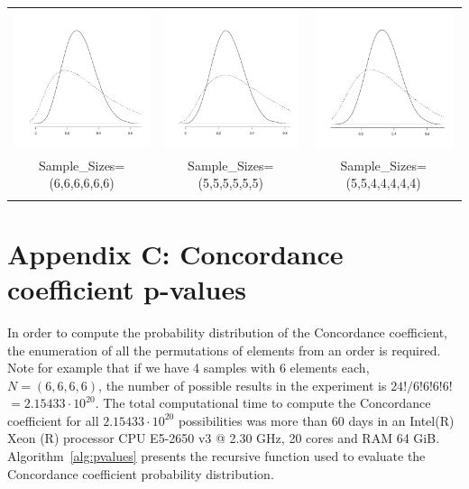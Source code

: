 \begin{appendix}
\begin{longtable}{ccc}
\includegraphics[width=4.05cm]{Sim_Kendall-Kruskal_66666_a.pdf} & 
		\includegraphics[width=4.05cm]{Sim_Kendall-Kruskal_555555_a.pdf} & 
		\includegraphics[width=4.05cm]{Sim_Kendall-Kruskal_5544444_a.pdf} \\ 
		              Sample\_Sizes=(6,6,6,6,6,6)  &   Sample\_Sizes=(5,5,5,5,5,5)  &    Sample\_Sizes=(5,5,4,4,4,4,4) \\  
		              \hline
\vspace{0.02cm}
\end{longtable}

\newpage

\section{Appendix C: Concordance coefficient p-values} \label{A:CCtables}

In order to compute the  probability distribution of the Concordance coefficient, the enumeration of all the permutations of elements from an order is required. Note for example that if we  have 4 samples with 6 elements each, $N=(6,6,6,6)$, the number of possible results in the experiment is $24!/6!6!6!6!$ $= 2.15433\cdot 10 ^{20}$. The total computational time to compute the Concordance coefficient for all $2.15433\cdot 10 ^{20}$ possibilities was  more than 60 days in an Intel(R) Xeon (R)   processor CPU E5-2650 v3 @ 2.30 GHz, 20 cores and RAM 64 GiB. Algorithm~\ref{alg:pvalues} presents the recursive function used to evaluate the Concordance coefficient probability distribution. 


\end{appendix}
